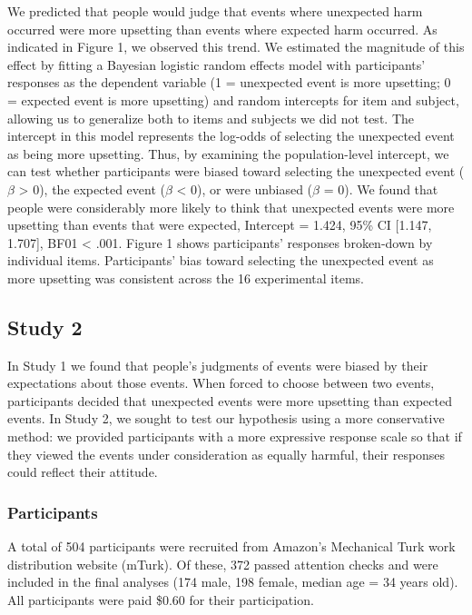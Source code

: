 \documentclass[9pt,twocolumn,twoside,lineno]{pnas-new}
\begin{document}
We predicted that people would judge that events where unexpected harm
occurred were more upsetting than events where expected harm occurred.
As indicated in Figure 1, we observed this trend. We estimated the
magnitude of this effect by fitting a Bayesian logistic random effects
model with participants' responses as the dependent variable (1 =
unexpected event is more upsetting; 0 = expected event is more
upsetting) and random intercepts for item and subject, allowing us to
generalize both to items and subjects we did not test. The intercept in
this model represents the log-odds of selecting the unexpected event as
being more upsetting. Thus, by examining the population-level intercept,
we can test whether participants were biased toward selecting the
unexpected event (\(\beta\) \textgreater{} 0), the expected event
(\(\beta\) \textless{} 0), or were unbiased (\(\beta\) = 0). We found
that people were considerably more likely to think that unexpected
events were more upsetting than events that were expected, Intercept =
1.424, 95\% CI {[}1.147, 1.707{]}, BF01 \textless{} .001. Figure 1 shows
participants' responses broken-down by individual items. Participants'
bias toward selecting the unexpected event as more upsetting was
consistent across the 16 experimental items.

\subsection*{Study 2}\label{study2}

In Study 1 we found that people's judgments of events were biased by
their expectations about those events. When forced to choose between two
events, participants decided that unexpected events were more upsetting
than expected events. In Study 2, we sought to test our hypothesis using
a more conservative method: we provided participants with a more
expressive response scale so that if they viewed the events under
consideration as equally harmful, their responses could reflect their
attitude.

\subsubsection*{Participants}\label{s2-participants}

A total of 504 participants were recruited from Amazon's Mechanical Turk
work distribution website (mTurk). Of these, 372 passed attention checks
and were included in the final analyses (174 male, 198 female, median
age = 34 years old). All participants were paid \$0.60 for their
participation.
\end{document}
